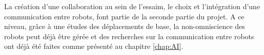 La création d'une collaboration au sein de l'essaim, le choix et l'intégration d'une communication entre robots, font partie de la seconde partie du projet. A ce niveau, grâce à une études des déplacements de base, la non-omniscience des robots peut déjà être gérée et des recherches sur la communication entre robots ont déjà été faites comme présenté au chapitre \ref{chap:AI}.
